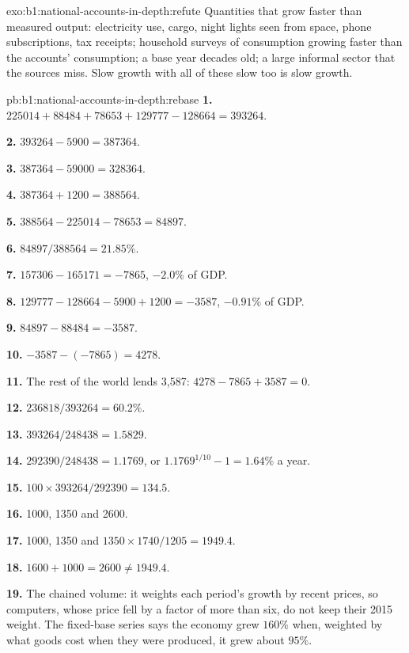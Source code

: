 \begin{solution}{exo:b1:national-accounts-in-depth:refute}
Quantities that grow faster than measured output: electricity use, cargo,
night lights seen from space, phone subscriptions, tax receipts; household
surveys of consumption growing faster than the accounts' consumption; a
base year decades old; a large informal sector that the sources miss.
Slow growth with all of these slow too is slow growth.
\end{solution}

\begin{solution}{pb:b1:national-accounts-in-depth:rebase}
\textbf{1.} $225014 + 88484 + 78653 + 129777 - 128664 = 393264$.

\textbf{2.} $393264 - 5900 = 387364$.

\textbf{3.} $387364 - 59000 = 328364$.

\textbf{4.} $387364 + 1200 = 388564$.

\textbf{5.} $388564 - 225014 - 78653 = 84897$.

\textbf{6.} $84897/388564 = 21.85\%$.

\textbf{7.} $157306 - 165171 = -7865$, $-2.0\%$ of GDP.

\textbf{8.} $129777 - 128664 - 5900 + 1200 = -3587$, $-0.91\%$ of GDP.

\textbf{9.} $84897 - 88484 = -3587$.

\textbf{10.} $-3587 - (-7865) = 4278$.

\textbf{11.} The rest of the world lends 3,587: $4278 - 7865 + 3587 = 0$.

\textbf{12.} $236818/393264 = 60.2\%$.

\textbf{13.} $393264/248438 = 1.5829$.

\textbf{14.} $292390/248438 = 1.1769$, or $1.1769^{1/10} - 1 = 1.64\%$ a year.

\textbf{15.} $100 \times 393264/292390 = 134.5$.

\textbf{16.} 1000, 1350 and 2600.

\textbf{17.} 1000, 1350 and $1350 \times 1740/1205 = 1949.4$.

\textbf{18.} $1600 + 1000 = 2600 \ne 1949.4$.

\textbf{19.} The chained volume: it weights each period's growth by
recent prices, so computers, whose price fell by a factor of more than six,
do not keep their 2015 weight. The fixed-base series says the economy grew
$160\%$ when, weighted by what goods cost when they were produced, it grew
about $95\%$.


\end{solution}
